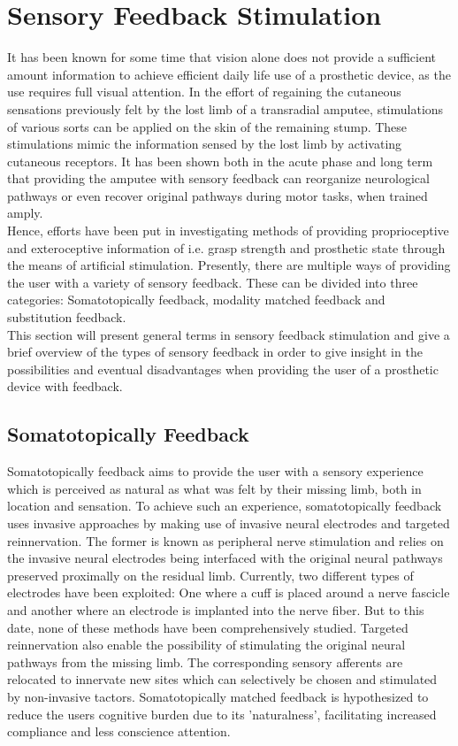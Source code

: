 \section{Sensory Feedback Stimulation} \label{SFS}

It has been known for some time that vision alone does not provide a sufficient amount information to achieve efficient daily life use of a prosthetic device, as the use requires full visual attention. In the effort of regaining the cutaneous sensations previously felt by the lost limb of a transradial amputee, stimulations of various sorts can be applied on the skin of the remaining stump. These stimulations mimic the information sensed by the lost limb by activating cutaneous receptors. It has been shown both in the acute phase and long term that providing the amputee with sensory feedback can reorganize neurological pathways or even recover original pathways during motor tasks, when trained amply. \cite{Pino2009} \\
Hence, efforts have been put in investigating methods of providing proprioceptive and exteroceptive information of i.e. grasp strength and prosthetic state through the means of artificial stimulation. \cite{Schofield2014,Stephens-Fripp2018} Presently, there are multiple ways of providing the user with a variety of sensory feedback. These can be divided into three categories: Somatotopically feedback, modality matched feedback and substitution feedback. \cite{Schofield2014} \\
This section will present general terms in sensory feedback stimulation and give a brief overview of the types of sensory feedback in order to give insight in the possibilities and eventual disadvantages when providing the user of a prosthetic device with feedback.

\subsection{Somatotopically Feedback}

Somatotopically feedback aims to provide the user with a sensory experience which is perceived as natural as what was felt by their missing limb, both in location and sensation. To achieve such an experience, somatotopically feedback uses invasive approaches by making use of invasive neural electrodes and targeted reinnervation. The former is known as peripheral nerve stimulation and relies on the invasive neural electrodes being interfaced with the original neural pathways preserved proximally on the residual limb. Currently, two different types of electrodes have been exploited: One where a cuff is placed around a nerve fascicle and another where an electrode is implanted into the nerve fiber. But to this date, none of these methods have been comprehensively studied. Targeted reinnervation also enable the possibility of stimulating the original neural pathways from the missing limb. The corresponding sensory afferents are relocated to innervate new sites which can selectively be chosen and stimulated by non-invasive tactors. Somatotopically matched feedback is hypothesized to reduce the users cognitive burden due to its 'naturalness', facilitating increased compliance and less conscience attention. \cite{Schofield2014}  

